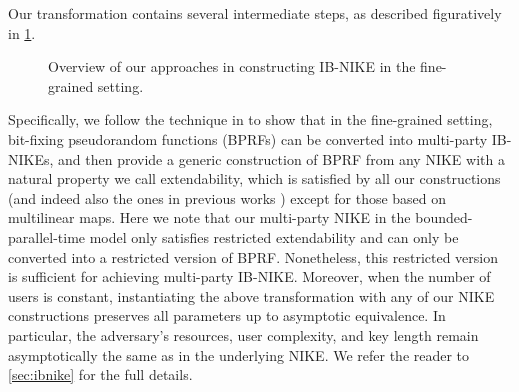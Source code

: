 Our transformation contains several intermediate steps, as described figuratively in \cref{fig:overview-ibnike}.
\begin{figure}
\caption{Overview of our approaches in constructing IB-NIKE in the fine-grained setting.}
\label{fig:overview-ibnike}
\end{figure} 
Specifically, we follow the technique in \cite{HKKW13} to show that in the fine-grained setting, bit-fixing pseudorandom functions (BPRFs) can be converted into multi-party IB-NIKEs, and then provide a generic construction of  BPRF from any NIKE with a natural property we call extendability, which is satisfied by all our constructions (and indeed also the ones in previous works \cite{Joux04,EC:ACMS23}) except for those based on multilinear maps.
Here we note that our multi-party NIKE in the bounded-parallel-time model only satisfies restricted extendability and can only be converted into a restricted version of BPRF. Nonetheless, this restricted version is sufficient for achieving multi-party IB-NIKE.
Moreover, when the number of users is constant, instantiating the above transformation with any of our NIKE constructions preserves all parameters up to asymptotic equivalence. In particular, the adversary’s resources, user complexity, and key length remain asymptotically the same as in the underlying NIKE.
We refer the reader to \cref{sec:ibnike} for the full details.

